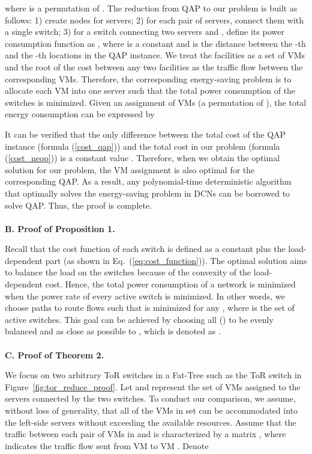 \documentclass[journal,single-space,two column,twoside,10pt]{IEEEtran}
\begin{document}
where  is a permutation of . The reduction from QAP to our problem is built as follows: 1) create  nodes for servers; 2) for each pair of servers, connect them with a single switch; 3) for a switch connecting two servers  and , define its power consumption function as , where  is a constant and  is the distance between the -th and the -th locations in the QAP instance. We treat the facilities as a set of VMs and the  root of the cost between any two facilities  as the traffic flow between the corresponding VMs. Therefore, the corresponding energy-saving problem is to allocate each VM into one server such that the total power consumption of the switches is minimized. Given an assignment of VMs  (a permutation of ), the total energy consumption can be expressed by

It can be verified that the only difference between the total cost of the QAP instance (formula (\ref{cost_qap})) and the total cost in our problem (formula (\ref{cost_neop})) is a constant value . Therefore, when we obtain the optimal solution for our problem, the VM assignment is also optimal for the corresponding QAP. As a result, any polynomial-time deterministic algorithm that optimally solves the energy-saving problem in DCNs can be borrowed to solve QAP. Thus, the proof is complete.
\\\\
\noindent\textbf{B. Proof of Proposition 1.}

Recall that the cost function of each switch is defined as a constant plus the load-dependent part (as shown in Eq.~(\ref{eq:cost_function})). The optimal solution aims to balance the load on the switches because of the convexity of the load-dependent cost.
Hence, the total power consumption of a network is minimized when the power rate of every active switch is minimized. In other words, we choose paths to route flows such that
 is minimized for any , where  is the set of active switches.
This goal can be achieved by choosing all  () to be evenly balanced and as close as possible to , which is denoted as .
\\\\
\noindent\textbf{C. Proof of Theorem 2.}

We focus on two arbitrary ToR switches in a Fat-Tree such as the ToR switch in Figure~\ref{fig:tor_reduce_proof}. Let  and  represent the set of VMs assigned to the servers connected by the two switches. To conduct our comparison, we assume, without loss of generality, that all of the VMs in set  can be accommodated into the left-side servers without
exceeding the available resources. Assume that the traffic between each pair of VMs in  and  is characterized by a matrix , where  indicates the traffic flow sent from VM  to VM . Denote
\end{document}
